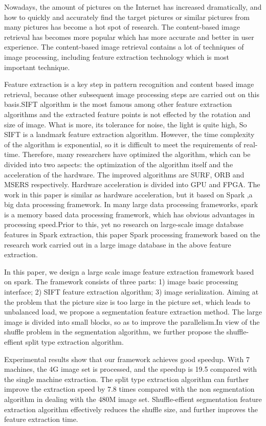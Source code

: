 \begin{eabstract}
Nowadays, the amount of pictures on the Internet has increased dramatically, and how to quickly and accurately find the target pictures or similar pictures from many pictures has become a hot spot of research. The content-based image retrieval has becomes more popular which has more accurate and better in user experience. The content-based image retrieval contains a lot of techniques of image processing, including feature extraction technology which is most important technique.

Feature extraction is a key step in pattern recognition and content based image retrieval, because other subsequent image processing steps are carried out on this basis.SIFT algorithm is the most famous among other feature extraction algorithms and the extracted feature points is not effected by the rotation and size of image. What is more, its tolerance for noise, the light is quite high, So SIFT is a landmark feature extraction algorithm. However, the time complexity of the algorithm is exponential, so it is difficult to meet the requirements of real-time. Therefore, many researchers have optimized the algorithm, which can be divided into two aspects: the optimization of the algorithm itself and the acceleration of the hardware. The improved algorithms are SURF, ORB and MSERS respectively. Hardware acceleration is divided into GPU and FPGA. The work in this paper is similar as hardware acceleration, but it based on Spark ,a big data processing framework. In many large data processing frameworks, spark is a memory based data processing framework, which has obvious advantages in processing speed.Prior to this, yet no research on large-scale image database features in Spark extraction, this paper Spark processing framework based on the research work carried out in a large image database in the above feature extraction.

In this paper, we design a large scale image feature extraction framework based on spark. The framework consists of three parts: 1) image basic processing interface; 2) SIFT feature extraction algorithm; 3) image serialization. Aiming at the problem that the picture size is too large in the picture set, which leads to unbalanced load, we propose a segmentation feature extraction method. The large image is divided into small blocks, so as to improve the parallelism.In view of the shuffle problem in the segmentation algorithm, we further propose the shuffle-effient split type extraction algorithm.

Experimental results show that our framework achieves good speedup. With 7 machines, the 4G image set is processed, and the speedup is 19.5 compared with the single machine extraction. The split type extraction algorithm can further improve the extraction speed by 7.8 times compared with the non segmentation algorithm in dealing with the 480M image set. Shuffle-effient segmentation feature extraction algorithm effectively reduces the shuffle size, and further improves the feature extraction time.

\end{eabstract}

